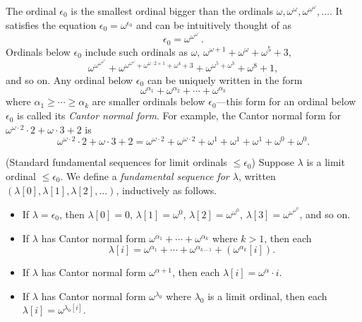 \documentclass[twoside,11pt]{article}
\begin{document}
The ordinal $\epsilon_0$ is the smallest ordinal bigger than the ordinals
$\omega,\omega^\omega,\omega^{\omega^\omega},\ldots$. It satisfies the equation
$\epsilon_0=\omega^{\epsilon_0}$ and can be intuitively thought of as
\[
    \epsilon_0 = \omega^{\omega^{\omega^{\iddots}}}.
\]
Ordinals below $\epsilon_0$ include such ordinals as $\omega$,
$\omega^{\omega+1}+\omega^{\omega}+\omega^5+3$,
\[
\omega^{\omega^{\omega^{\omega^\omega}}}+
\omega^{\omega^{\omega^\omega}+\omega^{\omega\cdot 2+1}+\omega^4 + 3}
+ \omega^{\omega^5+\omega^3}+\omega^8+1,
\]
and so on.
Any ordinal below $\epsilon_0$ can be uniquely written in the form
\[
    \omega^{\alpha_1}+\omega^{\alpha_2}+\cdots + \omega^{\alpha_k}
\]
where $\alpha_1\geq\cdots\geq\alpha_k$ are smaller ordinals below $\epsilon_0$---this form
for an ordinal below $\epsilon_0$ is called its \emph{Cantor normal form}.
For example, the Cantor normal form for $\omega^{\omega\cdot 2}\cdot 2+\omega\cdot 3+2$
is
\[
\omega^{\omega\cdot 2}\cdot 2+\omega\cdot 3+2
=
\omega^{\omega\cdot 2} + \omega^{\omega\cdot 2} + \omega^1 + \omega^1 + \omega^1
+\omega^0 + \omega^0.
\]

\begin{definition}
\label{fundsequencesdefn}
    (Standard fundamental sequences for limit ordinals $\leq\epsilon_0$)
    Suppose $\lambda$ is a limit ordinal $\leq\epsilon_0$. We define a
    \emph{fundamental sequence for $\lambda$},
    written $(\lambda[0],\lambda[1],\lambda[2],\ldots)$, inductively as follows.
    \begin{itemize}
        \item
        If $\lambda=\epsilon_0$, then $\lambda[0]=0$,
        $\lambda[1]=\omega^0$, $\lambda[2]=\omega^{\omega^0}$,
        $\lambda[3]=\omega^{\omega^{\omega^0}}$,
        and so on.
        \item
        If $\lambda$ has Cantor normal form
        $\omega^{\alpha_1}+\cdots+\omega^{\alpha_k}$ where $k>1$,
        then
        each
        \[
            \lambda[i] = \omega^{\alpha_1}+\cdots+\omega^{\alpha_{k-1}}
            + (\omega^{\alpha_k}[i]).
        \]
        \item
        If $\lambda$ has Cantor normal form $\omega^{\alpha+1}$,
        then each $\lambda[i]=\omega^{\alpha}\cdot i$.
        \item
        If $\lambda$ has Cantor normal form $\omega^{\lambda_0}$ where $\lambda_0$
        is a limit ordinal, then each $\lambda[i]=\omega^{\lambda_0[i]}$.
    \end{itemize}
\end{definition}
\end{document}
